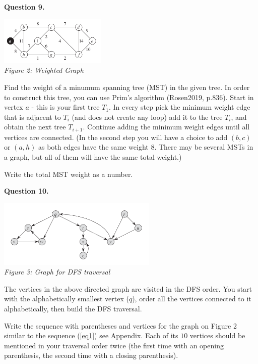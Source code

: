\documentclass[jou]{apa6}
\begin{document}
\newpage
{\bf Question 9.}
\begin{center}
\includegraphics[width=2in]{prim-algorithm.png}\\
{\em Figure 2: Weighted Graph}
\end{center}
Find the weight of a minumum spanning tree (MST) in the given tree. 
In order to construct this tree, you can use Prim's algorithm (Rosen2019, p.836). 
Start in vertex $a$ - this is your first tree $T_1$. 
In every step pick the minimum weight edge that is adjacent to $T_i$ (and does 
not create any loop) \textendash{} add it to the tree $T_i$, and obtain the next 
tree $T_{i+1}$. Continue adding the minimum weight edges until all vertices are connected.
(In the second step you will have a choice 
to add $(b,c)$ or $(a,h)$ as both edges have the same weight $8$. There may be several MSTs
in a graph, but all of them will have the same total weight.)

Write the total MST weight as a number.



\vspace{4pt}
{\bf Question 10.}
\begin{center}
\includegraphics[width=3in]{dfs-traversal2.png}\\
{\em Figure 3: Graph for DFS traversal}
\end{center}

The vertices in the above directed graph are visited in the DFS
order. You start with the alphabetically smallest vertex ($q$), order all the vertices connected to it
alphabetically, then build the DFS traversal. 

Write the sequence with parentheses and vertices for the graph 
on Figure 2 \textendash{} similar to the sequence (\ref{eq1}) \textendash{} see Appendix. 
Each of its $10$ vertices should be mentioned in your 
traversal order twice (the first time with an opening parenthesis, the second time 
with a closing parenthesis).
\end{document}
